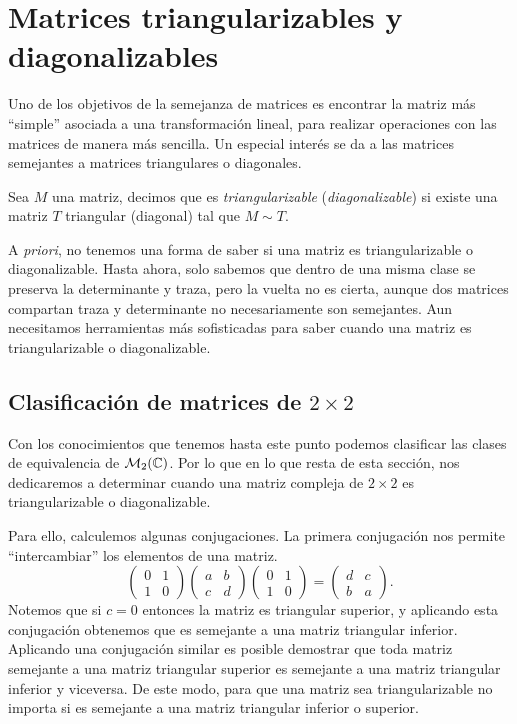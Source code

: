 \section{Matrices triangularizables y diagonalizables} \label{sec:TyDdeMat2x2}

Uno de los objetivos de la semejanza de matrices es encontrar la matriz más ``simple'' asociada a una transformación lineal, para realizar operaciones con las matrices de manera más sencilla. Un especial interés se da a las matrices semejantes a matrices triangulares o diagonales.

\begin{defi}
  Sea $M$ una matriz, decimos que es \emph{triangularizable} (\emph{diagonalizable}) si existe una matriz $T$ triangular (diagonal) tal que $M \sim T$.
\end{defi}

A \emph{priori}, no tenemos una forma de saber si una matriz es triangularizable o diagonalizable. Hasta ahora, solo sabemos que dentro de una misma clase se preserva la determinante y traza, pero la vuelta no es cierta, aunque dos matrices compartan traza y determinante no necesariamente son semejantes. Aun necesitamos herramientas más sofisticadas para saber cuando una matriz es triangularizable o diagonalizable.

\subsection{Clasificación de matrices de \texorpdfstring{$2\times 2$}{2x2}}

Con los conocimientos que tenemos hasta este punto podemos clasificar las clases de equivalencia de $\mathcal{M}_2(\mathbb{C})$. Por lo que en lo que resta de esta sección, nos dedicaremos a determinar cuando una matriz compleja de $2\times 2$ es triangularizable o diagonalizable.

Para ello, calculemos algunas conjugaciones. La primera conjugación nos permite ``intercambiar'' los elementos de una matriz.
\begin{equation}
  \begin{pmatrix} 0 & 1 \\ 1 & 0 \end{pmatrix}
  \begin{pmatrix} a & b \\ c & d \end{pmatrix}
  \begin{pmatrix} 0 & 1 \\ 1 & 0 \end{pmatrix}
    = \begin{pmatrix} d & c \\ b & a \end{pmatrix}. \label{eq:ConjI}
\end{equation}
Notemos que si $c = 0$ entonces la matriz es triangular superior, y aplicando esta conjugación obtenemos que es semejante a una matriz triangular inferior. Aplicando una conjugación similar es posible demostrar que toda matriz semejante a una matriz triangular superior es semejante a una matriz triangular inferior y viceversa. De este modo, para que una matriz sea triangularizable no importa si es semejante a una matriz triangular inferior o superior.

